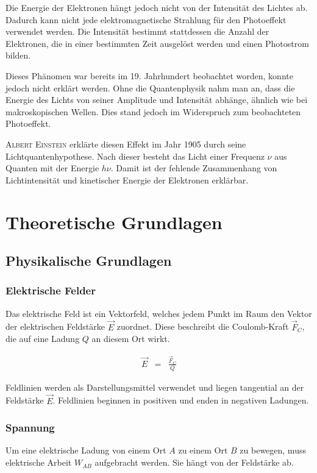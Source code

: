 \documentclass[12pt,a4paper]{scrartcl}
\numberwithin{equation}{section} %
\begin{document}
Die Energie der Elektronen hängt jedoch nicht von der Intensität des Lichtes ab. Dadurch kann nicht jede elektromagnetische Strahlung für den Photoeffekt verwendet werden. Die Intensität bestimmt stattdessen die Anzahl der Elektronen, die in einer bestimmten Zeit ausgelöst werden und einen Photostrom bilden.

Dieses Phänomen war bereits im 19. Jahrhundert beobachtet worden, konnte jedoch nicht erklärt werden. Ohne die Quantenphysik nahm man an, dass die Energie des Lichts von seiner Amplitude und Intensität abhänge, ähnlich wie bei makroskopischen Wellen. Dies stand jedoch im Widerspruch zum beobachteten Photoeffekt.

\textsc{Albert Einstein} erklärte diesen Effekt im Jahr 1905 durch seine Lichtquantenhypothese. Nach dieser besteht das Licht einer Frequenz $\nu$ aus Quanten mit der Energie $h\nu$. Damit ist der fehlende Zusammenhang von Lichtintensität und kinetischer Energie der Elektronen erklärbar.

\clearpage
\hypertarget{theoretische-grundlagen}{\section{Theoretische Grundlagen}\label{theoretische-grundlagen}}

\subsection{Physikalische Grundlagen}
\subsubsection{Elektrische Felder}
\label{Elektrische Felder}

Das elektrische Feld ist ein Vektorfeld, welches jedem Punkt im Raum den Vektor der elektrischen Feldstärke $\vec{E}$ zuordnet. Diese beschreibt die Coulomb-Kraft $\vec{F}_C$, die auf eine Ladung $Q$ an diesem Ort wirkt.

\begin{eqnarray}
	\vec{E} &=& \frac{\vec{F}_C}{Q}
\end{eqnarray}

\noindent
Feldlinien werden als Darstellungsmittel verwendet und liegen tangential an der Feldstärke $\vec{E}$. Feldlinien beginnen in positiven und enden in negativen Ladungen.

\subsubsection{Spannung}
\label{Spannung}
Um eine elektrische Ladung von einem Ort $A$ zu einem Ort $B$ zu bewegen, muss elektrische Arbeit $W_{AB}$ aufgebracht werden. Sie hängt von der Feldstärke ab.
\end{document}

